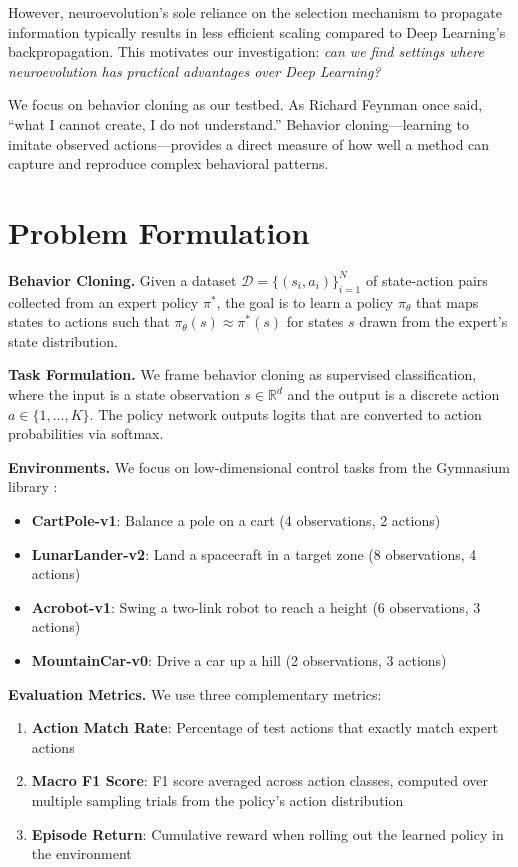 \documentclass{article}
\begin{document}
However, neuroevolution's sole reliance on the selection mechanism to propagate information typically results in less efficient scaling compared to Deep Learning's backpropagation. This motivates our investigation: \textit{can we find settings where neuroevolution has practical advantages over Deep Learning?}

We focus on behavior cloning as our testbed. As Richard Feynman once said, ``what I cannot create, I do not understand.'' Behavior cloning---learning to imitate observed actions---provides a direct measure of how well a method can capture and reproduce complex behavioral patterns.

\section{Problem Formulation}

\textbf{Behavior Cloning.} Given a dataset $\mathcal{D} = \{(s_i, a_i)\}_{i=1}^N$ of state-action pairs collected from an expert policy $\pi^*$, the goal is to learn a policy $\pi_\theta$ that maps states to actions such that $\pi_\theta(s) \approx \pi^*(s)$ for states $s$ drawn from the expert's state distribution.

\textbf{Task Formulation.} We frame behavior cloning as supervised classification, where the input is a state observation $s \in \mathbb{R}^d$ and the output is a discrete action $a \in \{1, \ldots, K\}$. The policy network outputs logits that are converted to action probabilities via softmax.

\textbf{Environments.} We focus on low-dimensional control tasks from the Gymnasium library \cite{towers2024gymnasium}:
\begin{itemize}
    \item \textbf{CartPole-v1}: Balance a pole on a cart (4 observations, 2 actions)
    \item \textbf{LunarLander-v2}: Land a spacecraft in a target zone (8 observations, 4 actions)
    \item \textbf{Acrobot-v1}: Swing a two-link robot to reach a height (6 observations, 3 actions)
    \item \textbf{MountainCar-v0}: Drive a car up a hill (2 observations, 3 actions)
\end{itemize}

\textbf{Evaluation Metrics.} We use three complementary metrics:
\begin{enumerate}
    \item \textbf{Action Match Rate}: Percentage of test actions that exactly match expert actions
    \item \textbf{Macro F1 Score}: F1 score averaged across action classes, computed over multiple sampling trials from the policy's action distribution
    \item \textbf{Episode Return}: Cumulative reward when rolling out the learned policy in the environment
\end{enumerate}
\end{document}
